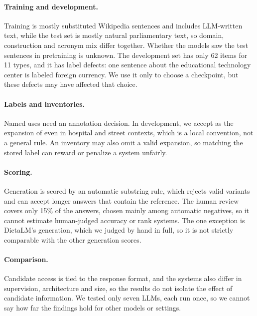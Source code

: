 \documentclass[11pt]{article}
\newcommand{\heb}[1]{\R{#1}}
\begin{document}
\paragraph{Training and development.} Training is mostly substituted Wikipedia sentences and includes LLM-written text, while the test set is mostly natural parliamentary text, so domain, construction and acronym mix differ together. Whether the models saw the test sentences in pretraining is unknown. The development set has only 62 items for 11 types, and it has label defects: one \heb{מט״ח} sentence about the educational technology center is labeled foreign currency. We use it only to choose a checkpoint, but these defects may have affected that choice.

\paragraph{Labels and inventories.} Named uses need an annotation decision. In development, we accept \heb{רבי משה בן מימון} as the expansion of \heb{רמב״ם} even in hospital and street contexts, which is a local convention, not a general rule. An inventory may also omit a valid expansion, so matching the stored label can reward or penalize a system unfairly.

\paragraph{Scoring.} Generation is scored by an automatic substring rule, which rejects valid variants and can accept longer answers that contain the reference. The human review covers only 15\% of the answers, chosen mainly among automatic negatives, so it cannot estimate human-judged accuracy or rank systems. The one exception is DictaLM's generation, which we judged by hand in full, so it is not strictly comparable with the other generation scores.

\paragraph{Comparison.} Candidate access is tied to the response format, and the systems also differ in supervision, architecture and size, so the results do not isolate the effect of candidate information. We tested only seven LLMs, each run once, so we cannot say how far the findings hold for other models or settings.

\end{document}
